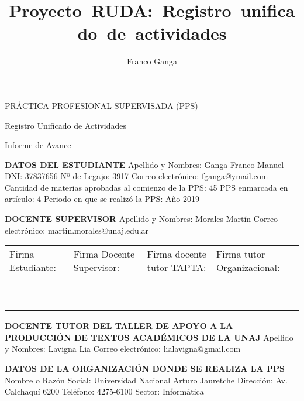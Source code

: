 \documentclass[12pt]{article}
\author{Franco Ganga}
\title{Proyecto\ RUDA:\ Registro\ unificado\ de\ actividades}
\begin{document}
\centerline{\large{PRÁCTICA PROFESIONAL SUPERVISADA (PPS)}}
\centerline{\large{Registro Unificado de Actividades}}
\centerline{\large{Informe de Avance}}
\begin{framed}
        \noindent\textbf{DATOS DEL ESTUDIANTE}\newline
        Apellido y Nombres: Ganga Franco Manuel\newline
        DNI: 37837656\newline
        Nº de Legajo: 3917\newline
        Correo electr\'{o}nico: fganga@ymail.com\newline
        Cantidad de materias aprobadas al comienzo de la PPS: 45\newline
        PPS enmarcada en art\'{i}culo: 4 \newline
        Periodo en que se realiz\'{o} la PPS: Año 2019
\end{framed}

\begin{framed}
        \noindent\textbf{DOCENTE SUPERVISOR}  \newline
        Apellido y Nombres: Morales Martín \newline
        Correo electr\'{o}nico: martin.morales@unaj.edu.ar
\end{framed}

\vfill
\noindent\begin{tabular}{|P{3.3cm}|P{3.3cm}|P{3.3cm}|P{3.3cm}|}
\hline
Firma Estudiante: & Firma Docente Supervisor: & Firma docente tutor TAPTA: & Firma tutor Organizacional: \\
~ & ~ & ~ & ~ \\
~ & ~ & ~ & ~ \\
\hline
\end{tabular}
\newpage

\begin{framed}
        \noindent\textbf{DOCENTE  TUTOR DEL TALLER DE APOYO A LA PRODUCCI\'{O}N DE TEXTOS ACAD\'{E}MICOS DE LA UNAJ}\newline
        Apellido y Nombres: Lavigna Lia \newline
        Correo electr\'{o}nico: lialavigna@gmail.com
\end{framed}

\begin{framed}
\noindent\textbf{DATOS DE LA ORGANIZACI\'{O}N DONDE SE REALIZA LA PPS}\newline
Nombre o Raz\'{o}n Social: Universidad Nacional Arturo Jauretche\newline
Direcci\'{o}n: Av. Calchaquí 6200\newline
Tel\'{e}fono: 4275-6100 \newline
Sector: Informática
\end{framed}
\end{document}
